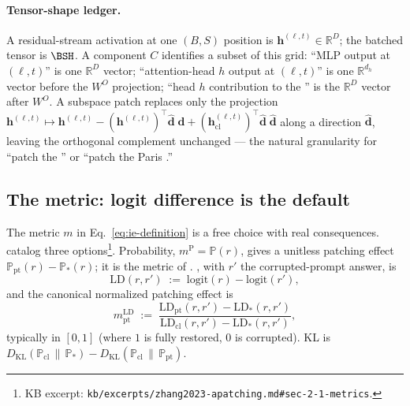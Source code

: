 \paragraph{Tensor-shape ledger.} A residual-stream activation at one
$(B, S)$ position is $\mathbf{h}^{(\ell, t)} \in \mathbb{R}^{D}$; the
batched tensor is $\BSH$. A
component $C$ identifies a subset of this grid: ``MLP output at
$(\ell, t)$'' is one $\mathbb{R}^{D}$ vector; ``attention-head $h$
output at $(\ell, t)$'' is one $\mathbb{R}^{d_h}$ vector before the
$W^O$ projection; ``head $h$ contribution to the '' is
the $\mathbb{R}^{D}$ vector after $W^O$. A subspace patch replaces only
the projection
$\mathbf{h}^{(\ell, t)} \mapsto \mathbf{h}^{(\ell, t)} -
(\mathbf{h}^{(\ell, t)})^{\top}\hat{\mathbf{d}}\;\hat{\mathbf{d}} +
(\mathbf{h}_{\text{cl}}^{(\ell, t)})^{\top}\hat{\mathbf{d}}\;
\hat{\mathbf{d}}$ along a  direction $\hat{\mathbf{d}}$, leaving
the orthogonal complement unchanged --- the natural granularity for
``patch the '' or ``patch the Paris .''

\subsection{The metric: logit difference is the default}
\label{sec:patching-metric}

The metric $m$ in Eq.~\eqref{eq:ie-definition} is a free choice with
real consequences. \citet[\S 2.1]{zhang2023-apatching} catalog three
options\footnote{KB excerpt:
\nolinkurl{kb/excerpts/zhang2023-apatching.md#sec-2-1-metrics}.}.
Probability, $m^{\mathrm{P}} = \mathbb{P}(r)$, gives a unitless
patching effect $\mathbb{P}_{\text{pt}}(r) - \mathbb{P}_{*}(r)$; it is
the metric of \citet{meng2022-rome}. , with $r'$ the
corrupted-prompt answer, is
\begin{equation}
  \mathrm{LD}(r, r') \;:=\; \mathrm{logit}(r) - \mathrm{logit}(r'),
  \label{eq:logit-diff}
\end{equation}
and the canonical normalized patching effect is
\citep[\S 2.1]{zhang2023-apatching}
\begin{equation}
  m^{\mathrm{LD}}_{\text{pt}} \;:=\;
  \frac{\mathrm{LD}_{\text{pt}}(r, r') - \mathrm{LD}_{*}(r, r')}{
        \mathrm{LD}_{\text{cl}}(r, r') - \mathrm{LD}_{*}(r, r')},
  \label{eq:logit-diff-normalized}
\end{equation}
typically in $[0, 1]$ (where $1$ is fully restored, $0$ is corrupted).
KL is
$D_{\mathrm{KL}}(\mathbb{P}_{\text{cl}} \,\|\, \mathbb{P}_{*}) -
 D_{\mathrm{KL}}(\mathbb{P}_{\text{cl}} \,\|\, \mathbb{P}_{\text{pt}})$.

